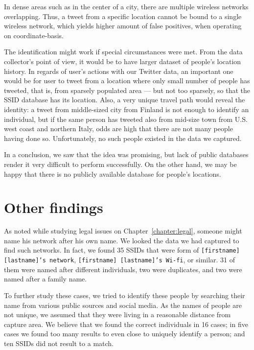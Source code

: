 \documentclass[12pt,a4paper,oneside,pdftex]{report}
\begin{document}
In dense areas such as in the center of a city, there are multiple wireless networks overlapping. Thus, a tweet from a specific location cannot be bound to a single wireless network, which yields higher amount of false positives, when operating on coordinate-basis.

The identification might work if special circumstances were met. From the data collector's point of view, it would be to have larger dataset of people's location history. In regards of user's actions with our Twitter data, an important one would be for user to tweet from a location where only small number of people has tweeted, that is, from sparsely populated area --- but not too sparsely, so that the SSID database has its location. Also, a very unique travel path would reveal the identity: a tweet from middle-sized city from Finland is not enough to identify an individual, but if the same person has tweeted also from mid-size town from U.S. west coast and northern Italy, odds are high that there are not many people having done so. Unfortunately, no such people existed in the data we captured.

In a conclusion, we saw that the idea was promising, but lack of public databases render it very difficult to perform successfully. On the other hand, we may be happy that there is no publicly available database for people's locations.

\section{Other findings}
\label{sec:practical_other}

As noted while studying legal issues on Chapter~\ref{chapter:legal}, someone might name his network after his own name. We looked the data we had captured to find such networks. In fact, we found 35 SSIDs that were form of \texttt{[firstname] [lastname]'s network}, \texttt{[firstname] [lastname]'s Wi-fi}, or similar. 31 of them were named after different individuals, two were duplicates, and two were named after a family name.

To further study these cases, we tried to identify these people by searching their name from various public sources and social media. As the names of people are not unique, we assumed that they were living in a reasonable distance from capture area. We believe that we found the correct individuals in 16 cases; in five cases we found too many results to even close to uniquely identify a person; and ten SSIDs did not result to a match.
\end{document}
